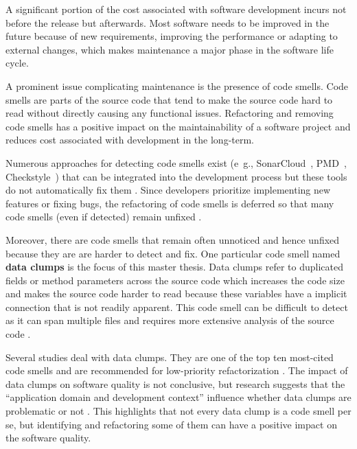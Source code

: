 \label{sec:introduction}

A significant portion of the cost associated with software development incurs not before the release but afterwards. Most software needs to be improved in the future because of new requirements, improving the performance or adapting to external changes, which makes maintenance a major phase in the  software life cycle. \cite{465272}


A prominent issue  complicating maintenance is the presence of code smells. Code smells are parts of the source code that tend to make the source code hard to read without directly causing any functional issues. Refactoring and removing code smells has a positive impact on the maintainability  of a software project and reduces cost associated with development in the long-term.\cite{mealyEvaluatingSoftwareRefactoring2006}



Numerous approaches for detecting code smells exist (e~g., SonarCloud~\cite{sonarcloud},  PMD~\cite{pmd}, Checkstyle~\cite{checkstyle}) that can be integrated into the development process but these tools do not automatically fix them  \cite{vidalApproachPrioritizeCode2016}. Since developers prioritize implementing new features or fixing bugs, the refactoring of code smells is deferred so that many code smells (even if detected) remain unfixed   \cite{10.1145/2393596.2393655}.

Moreover, there are code smells that remain often unnoticed and hence unfixed because they are are harder to detect and fix. One particular code smell named \textbf{data clumps} is the focus of this master thesis. Data clumps refer to duplicated fields or method parameters across the source code which increases the code size and makes the source code harder to read because these variables have a implicit connection that is not readily apparent.  This code smell can be difficult to detect as it can span multiple files and requires more extensive analysis of the source code \cite{BaumgartnerAP23}  \cite{data_clumps_refactoring_guru} \cite{join_data_items}.
 
Several studies deal with data clumps. They are one of the top ten most-cited code smells \cite{lacerda} and are recommended for low-priority refactorization \cite{zhangPrioritisingRefactoringUsing2011}. The impact of data clumps on software quality is not conclusive, but research suggests that the \enquote{application domain and development context} influence whether data clumps are problematic or not \cite{hallCodeSmellsHave2014}. This highlights that not every data clump is a code smell per se, but identifying and refactoring some of them can have a positive impact on the software quality. 

